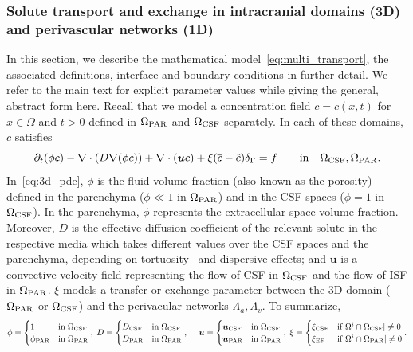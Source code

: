 \subsubsection{Solute transport and exchange in intracranial domains (3D) and perivascular networks (1D)}

In this section, we describe the mathematical
model~\eqref{eq:multi_transport}, the associated definitions,
interface and boundary conditions in further detail. We refer to the
main text for explicit parameter values while giving the general, abstract
form here. Recall that we model a concentration field $c = c(x, t)$
for $x \in \Omega$ and $t > 0$ defined in $\Omega_{\rm PAR}$ and
$\Omega_{\rm CSF}$ separately. In each of these domains, $c$ satisfies
\begin{equation}
  \partial_t (\phi c) - \nabla \cdot (D \nabla (\phi c) ) + \nabla \cdot (\bm u c ) + \xi (\overline{c} - \hat c ) \delta_\Gamma = f \quad \quad \mathrm{in} \quad \Omega_{\rm CSF}, \Omega_{\rm{PAR}}.
  \label{eq:3d_pde}
\end{equation}
In~\eqref{eq:3d_pde}, $\phi$ is the fluid volume fraction (also known as the porosity) defined in the parenchyma ($\phi \ll 1$ in $\Omega_{\rm PAR}$) and in the CSF spaces ($\phi = 1$ in $\Omega_{\rm CSF}$). In the parenchyma, $\phi$ represents the extracellular space volume fraction. Moreover, $D$ is the effective diffusion coefficient of the relevant solute in the respective media which takes different values over the CSF spaces and the parenchyma, depending on tortuosity~\cite{sykova2008diffusion} and dispersive effects; and $\bm u$ is a convective velocity field representing the flow of CSF in $\Omega_{\rm CSF}$ and the flow of ISF in $\Omega_{\rm PAR}$. $\xi$ models a transfer or exchange parameter between the 3D domain ($\Omega_{\rm PAR}$ or $\Omega_{\rm CSF}$) and the perivacular networks $\Lambda_a, \Lambda_v$. To summarize,
\[
\phi =  \begin{cases}
  1  & \mathrm{in} \;  \Omega_{\rm{CSF}} \\ 
  \phi_{\rm{PAR}} & \mathrm{in} \; \Omega_{\rm{PAR}} 
  \end{cases}, \; 
D = \begin{cases}
  D_{\rm{CSF}} & \mathrm{in} \;  \Omega_{\rm{CSF}} \\ 
  D_{\rm{PAR}} & \mathrm{in} \; \Omega_{\rm{PAR}} \end{cases}, \; 
  \quad \bm u  = \begin{cases}
  \bm{u}_{\rm{CSF}} & \mathrm{in} \; \Omega_{\rm{CSF}} \\ 
  \bm{u}_{\rm{PAR}} & \mathrm{in} \; \Omega_{\rm{PAR}} 
\end{cases}, \; 
\xi = \begin{cases}
  \xi_{\rm{CSF}} & \mathrm{if} |\Omega^i \cap \Omega_{\rm{CSF}}| \neq 0 \\
  \xi_{\rm{EF}} & \mathrm{if} |\Omega^i \cap \Omega_{\rm{PAR}}| \neq 0  
\end{cases} . 
\]
